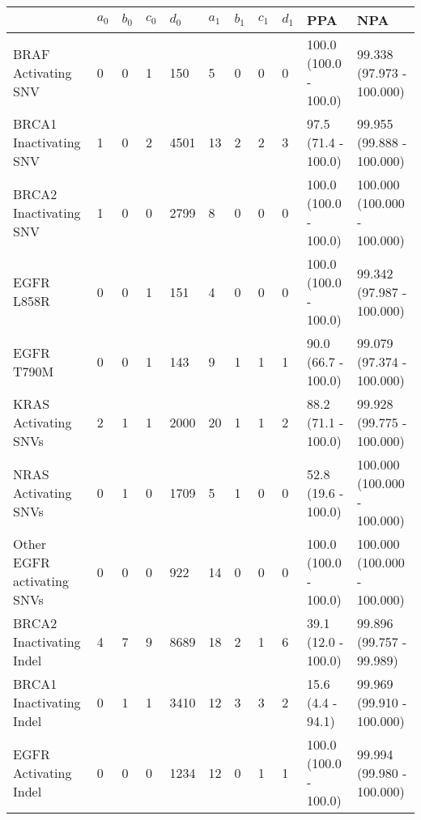 \begin{tabular}{|l|l|l|l|l|l|l|l|l|l|l|}
\hline
\rowcolor[gray]{.85}{}                           & \textbf{$a_0$} & \textbf{$b_0$} & \textbf{$c_0$} & \textbf{$d_0$} & \textbf{$a_1$} & \textbf{$b_1$} & \textbf{$c_1$} & \textbf{$d_1$} & \textbf{PPA} & \textbf{                          NPA }\\ \hline
BRAF Activating SNV         &      0 &      0 &      1 &    150 &      5 &      0 &      0 &      0 &  100.0 (100.0 - 100.0) &    99.338 (97.973 - 100.000) \\ \hline
BRCA1 Inactivating SNV      &      1 &      0 &      2 &   4501 &     13 &      2 &      2 &      3 &    97.5 (71.4 - 100.0) &    99.955 (99.888 - 100.000) \\ \hline
BRCA2 Inactivating SNV      &      1 &      0 &      0 &   2799 &      8 &      0 &      0 &      0 &  100.0 (100.0 - 100.0) &  100.000 (100.000 - 100.000) \\ \hline
EGFR L858R                  &      0 &      0 &      1 &    151 &      4 &      0 &      0 &      0 &  100.0 (100.0 - 100.0) &    99.342 (97.987 - 100.000) \\ \hline
EGFR T790M                  &      0 &      0 &      1 &    143 &      9 &      1 &      1 &      1 &    90.0 (66.7 - 100.0) &    99.079 (97.374 - 100.000) \\ \hline
KRAS Activating SNVs        &      2 &      1 &      1 &   2000 &     20 &      1 &      1 &      2 &    88.2 (71.1 - 100.0) &    99.928 (99.775 - 100.000) \\ \hline
NRAS Activating SNVs        &      0 &      1 &      0 &   1709 &      5 &      1 &      0 &      0 &    52.8 (19.6 - 100.0) &  100.000 (100.000 - 100.000) \\ \hline
Other EGFR activating SNVs  &      0 &      0 &      0 &    922 &     14 &      0 &      0 &      0 &  100.0 (100.0 - 100.0) &  100.000 (100.000 - 100.000) \\ \hline
BRCA2 Inactivating Indel    &      4 &      7 &      9 &   8689 &     18 &      2 &      1 &      6 &    39.1 (12.0 - 100.0) &     99.896 (99.757 - 99.989) \\ \hline
BRCA1 Inactivating Indel    &      0 &      1 &      1 &   3410 &     12 &      3 &      3 &      2 &      15.6 (4.4 - 94.1) &    99.969 (99.910 - 100.000) \\ \hline
EGFR Activating Indel       &      0 &      0 &      0 &   1234 &     12 &      0 &      1 &      1 &  100.0 (100.0 - 100.0) &    99.994 (99.980 - 100.000) \\ \hline

\end{tabular}
